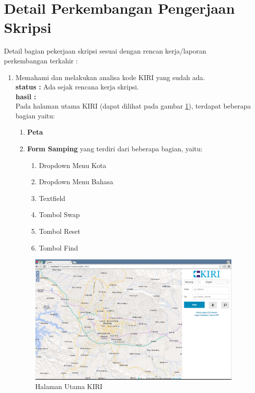 \documentclass[a4paper,twoside]{article}
\begin{document}
\section{Detail Perkembangan Pengerjaan Skripsi}
Detail bagian pekerjaan skripsi sesuai dengan rencan kerja/laporan perkembangan terkahir :
  \begin{enumerate}
    \item Memahami dan melakukan analisa kode KIRI yang sudah ada.\\
    {\bf status :} Ada sejak rencana kerja skripsi.\\
    {\bf hasil :} \\
    Pada halaman utama KIRI (dapat dilihat pada gambar \ref{fig:3_KIRI_main}), terdapat beberapa bagian yaitu:
    \begin{enumerate}
    		\item \textbf{Peta}
    		\item \textbf{Form Samping} yang terdiri dari beberapa bagian, yaitu:
    		\begin{enumerate}
    			\item Dropdown Menu Kota
    			\item Dropdown Menu Bahasa
    			\item Textfield
    			\item Tombol Swap
    			\item Tombol Reset
    			\item Tombol Find
    		\end{enumerate}
    \end{enumerate}

\begin{figure}[H]
  \centering
  \includegraphics[scale=0.3]{Gambar/KIRI-main}
  \caption{Halaman Utama KIRI} 
  \label{fig:3_KIRI_main}
\end{figure}


\end{enumerate}
\end{document}
